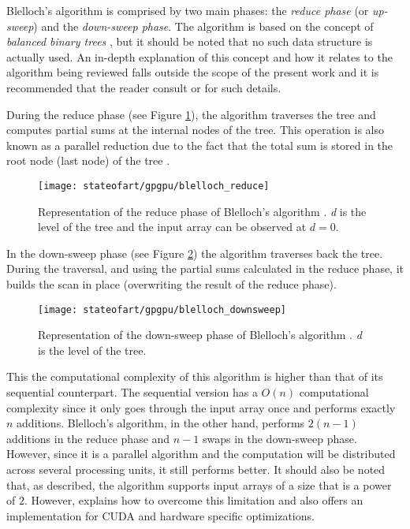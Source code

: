 Blelloch's algorithm is comprised by two main phases: the \emph{reduce phase} (or \emph{up-sweep}) and the \emph{down-sweep phase}.
The algorithm is based on the concept of \emph{balanced binary trees} \cite{Harris2007}, but it should be noted that no such data structure is actually used.
An in-depth explanation of this concept and how it relates to the algorithm being reviewed falls outside the scope of the present work and it is recommended that the reader consult \cite{Harris2007} or \cite{Blelloch1990} for such details.

During the reduce phase (see Figure \ref{fig:scan reduce}), the algorithm traverses the tree and computes partial sums at the internal nodes of the tree.
This operation is also known as a parallel reduction due to the fact that the total sum is stored in the root node (last node) of the tree \cite{Harris2007}.

\begin{figure}[hbtp]
\centering
\texttt{[image: stateofart/gpgpu/blelloch\_reduce]}
\caption{Representation of the reduce phase of Blelloch's algorithm \cite{Harris2007}. \emph{d} is the level of the tree and the input array can be observed at $d=0$.}
\label{fig:scan reduce}
\end{figure}

In the down-sweep phase (see Figure \ref{fig:scan down-sweep}) the algorithm traverses back the tree.
During the traversal, and using the partial sums calculated in the reduce phase, it builds the scan in place (overwriting the result of the reduce phase).

\begin{figure}[hbtp]
\centering
\texttt{[image: stateofart/gpgpu/blelloch\_downsweep]}
\caption{Representation of the down-sweep phase of Blelloch's algorithm \cite{Harris2007}. \emph{d} is the level of the tree.}
\label{fig:scan down-sweep}
\end{figure}

This the computational complexity of this algorithm is higher than that of its sequential counterpart.
The sequential version has a $O(n)$ computational complexity since it only goes through the input array once and performs exactly $n$ additions.
Blelloch's algorithm, in the other hand, performs $2(n-1)$ additions in the reduce phase and $n-1$ swaps in the down-sweep phase.
However, since it is a parallel algorithm and the computation will be distributed across several processing units, it still performs better.
It should also be noted that, as described, the algorithm supports input arrays of a size that is a power of $2$.
However, \cite{Harris2007} explains how to overcome this limitation and also offers an implementation for CUDA and hardware specific optimizations.